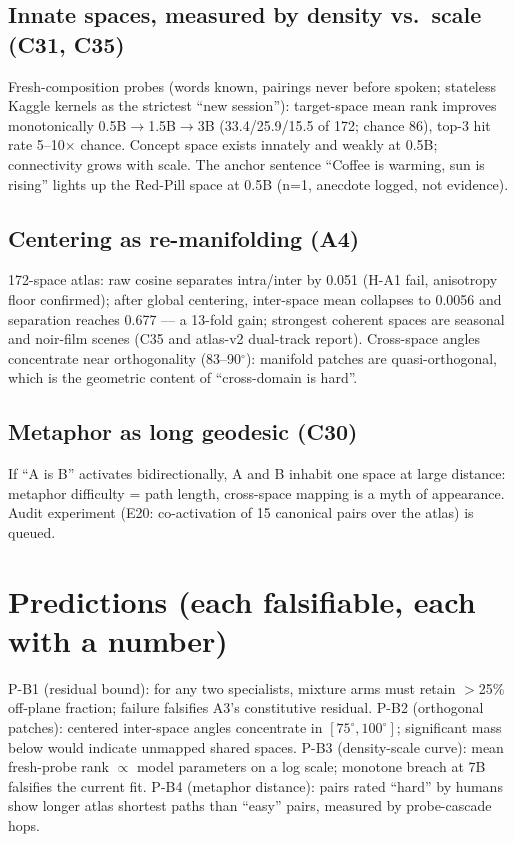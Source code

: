 \documentclass[11pt]{article}
\begin{document}
\subsection{Innate spaces, measured by density vs.\ scale (C31, C35)}
Fresh-composition probes (words known, pairings never before spoken; stateless
Kaggle kernels as the strictest ``new session''): target-space mean rank improves
monotonically 0.5B$\to$1.5B$\to$3B (33.4/25.9/15.5 of 172; chance 86), top-3 hit rate
5--10$\times$ chance. Concept space exists innately and weakly at 0.5B; connectivity
grows with scale. The anchor sentence ``Coffee is warming, sun is rising'' lights up
the Red-Pill space at 0.5B (n=1, anecdote logged, not evidence).

\subsection{Centering as re-manifolding (A4)}
172-space atlas: raw cosine separates intra/inter by 0.051 (H-A1 fail, anisotropy
floor confirmed); after global centering, inter-space mean collapses to 0.0056 and
separation reaches 0.677 --- a 13-fold gain; strongest coherent spaces are seasonal
and noir-film scenes (C35 and atlas-v2 dual-track report). Cross-space angles
concentrate near orthogonality (83--90$^\circ$): manifold patches are quasi-orthogonal,
which is the geometric content of ``cross-domain is hard''.

\subsection{Metaphor as long geodesic (C30)}
If ``A is B'' activates bidirectionally, A and B inhabit one space at large distance:
metaphor difficulty = path length, cross-space mapping is a myth of appearance.
Audit experiment (E20: co-activation of 15 canonical pairs over the atlas) is queued.

\section{Predictions (each falsifiable, each with a number)}
P-B1 (residual bound): for any two specialists, mixture arms must retain
$>$25\% off-plane fraction; failure falsifies A3's constitutive residual.
P-B2 (orthogonal patches): centered inter-space angles concentrate in
$[75^\circ,100^\circ]$; significant mass below would indicate unmapped shared spaces.
P-B3 (density-scale curve): mean fresh-probe rank $\propto$ model parameters on a
log scale; monotone breach at 7B falsifies the current fit.
P-B4 (metaphor distance): pairs rated ``hard'' by humans show longer atlas shortest
paths than ``easy'' pairs, measured by probe-cascade hops.
\end{document}
